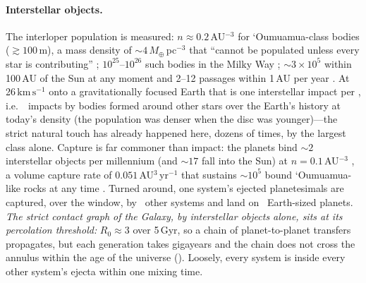 \documentclass[11pt]{article}
\newcommand{\kms}{\ensuremath{\,\mathrm{km\,s^{-1}}}\xspace}
\newcommand{\Mearth}{\ensuremath{M_\oplus}\xspace}
\begin{document}
\paragraph{Interstellar objects.}  The interloper population is measured:
$n\approx0.2$\,AU$^{-3}$ for `Oumuamua-class bodies ($\gtrsim100$\,m), a mass
density of $\sim4\,\Mearth$\,pc$^{-3}$ that ``cannot be populated unless every
star is contributing'' \citep{Do2018}; $10^{25}$--$10^{26}$ such bodies in the
Milky Way \citep{JewittSeligman2023}; $\sim3\times10^{5}$ within 100\,AU of the
Sun at any moment and 2--12 passages within 1\,AU per year
\citep{PortegiesZwart2018}.  At 26\kms onto a gravitationally focused Earth
that is one interstellar impact per \IsoImpactWaitPlanet, i.e.\
\IsoImpactsOnEarth\ impacts by bodies formed around other stars over the
Earth's history at today's density (the population was denser when the disc
was younger)---the strict natural touch has already happened here, dozens
of times, by the largest class alone.  Capture is far commoner than impact:
the planets bind $\sim2$ interstellar objects per millennium (and $\sim17$ fall
into the Sun) at $n=0.1$\,AU$^{-3}$ \citep{Dehnen2022}, a volume capture rate
of $0.051$\,AU$^{3}$\,yr$^{-1}$ that sustains $\sim10^{5}$ bound `Oumuamua-like
rocks at any time \citep{HandsDehnen2020,Napier2021capture,SirajLoeb2019trapped}.
Turned around, one system's ejected planetesimals are captured, over the
window, by \IsoRZeroCapture\ other systems and land on \IsoRZeroStrict\
Earth-sized planets.  \emph{The strict contact graph of the Galaxy, by
interstellar objects alone, sits at its percolation threshold:} $R_{0}\approx3$
over 5\,Gyr, so a chain of planet-to-planet transfers propagates, but each
generation takes gigayears and the chain does not cross the annulus within the
age of the universe (\IsoEpidemicStrict).  Loosely, every system is inside
every other system's ejecta within one mixing time.
\end{document}
